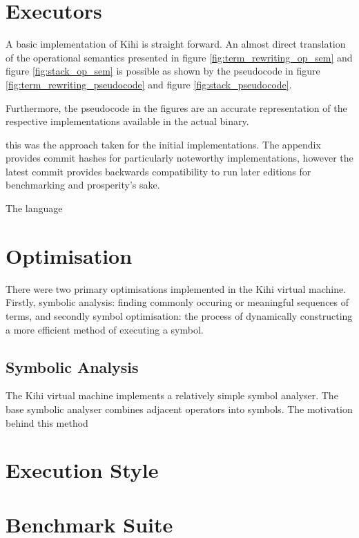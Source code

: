 
\section{Executors}\label{sec:implementation_executors}
A basic implementation of Kihi is straight forward. An almost direct translation of the operational semantics presented in figure \ref{fig:term_rewriting_op_sem} and figure \ref{fig:stack_op_sem} is possible as shown by the pseudocode in figure \ref{fig:term_rewriting_pseudocode} and figure \ref{fig:stack_pseudocode}. 

Furthermore, the pseudocode in the figures are an accurate representation of the respective implementations available in the actual binary.


this was the approach taken for the initial implementations. The appendix provides commit hashes for particularly noteworthy implementations, however the latest commit provides backwards compatibility to run later editions for benchmarking and prosperity's sake.

The language




\section{Optimisation}\label{sec:implementation_optimisation}
There were two primary optimisations implemented in the Kihi virtual
machine. Firstly, symbolic analysis: finding commonly occuring or
meaningful sequences of terms, and secondly symbol optimisation: the
process of dynamically constructing a more efficient method of executing
a symbol. 

\subsection{Symbolic Analysis}
The Kihi virtual machine implements a relatively simple symbol analyser.
The base symbolic analyser combines adjacent operators into symbols. The
motivation behind this method

\section{Execution Style}


\section{Benchmark Suite}


